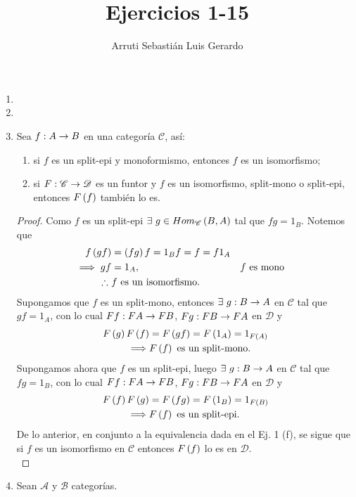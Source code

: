 \documentclass{article}
\title{Ejercicios 1-15}
\author{Arruti Sebastián Luis Gerardo}
\begin{document}
	\begin{enumerate}[label=\textbf{Ej \arabic*.}]
		\item 
		\item
		\item Sea $\catarrow{f}{A}{B}{}$ en una categoría $\mathscr{C}$, así:
		\begin{enumerate}
			\item si $f$ es un split-epi y monoformismo, entonces $f$ es un isomorfismo;
			\item si $\catarrow{F}{\mathscr{C}}{\mathscr{D}}{}$ es un funtor y $f$ es un isomorfismo, split-mono o split-epi, entonces $F\left(f\right)$ también lo es.
		\end{enumerate}
		\begin{proof}
			 Como $f$ es un split-epi $\exists\ g\in\ringmodhom{\mathscr{C}}{B}{A}$ tal que $fg=1_B$. Notemos que
			\begin{align*}
				f\left(gf\right)&=\left(fg\right)f=1_B f=f=f1_A\\
				\implies gf&=1_A, && f\text{ es mono}\\
				\therefore\ & f \text{ es un isomorfismo.}
			\end{align*}
			 Supongamos que $f$ es un split-mono, entonces $\exists\ \catarrow{g}{B}{A}{}$ en $\mathscr{C}$ tal que $gf=1_A$, con lo cual $\catarrow{Ff}{FA}{FB}{}$, $\catarrow{Fg}{FB}{FA}{}$ en $\mathscr{D}$ y
			\begin{align*}
				F\left(g\right)F\left(f\right)&=F\left(gf\right)=F\left(1_A\right)=1_{F\left(A\right)}\\
				\implies & F\left(f\right)\text{ es un split-mono.}
			\end{align*}
			Supongamos ahora que $f$ es un split-epi, luego $\exists\ \catarrow{g}{B}{A}{}$ en $\mathscr{C}$ tal que $fg=1_B$, con lo cual $\catarrow{Ff}{FA}{FB}{}$, $\catarrow{Fg}{FB}{FA}{}$ en $\mathscr{D}$ y
			\begin{align*}
				F\left(f\right)F\left(g\right)&=F\left(fg\right)=F\left(1_B\right)=1_{F\left(B\right)}\\
				\implies & F\left(f\right)\text{ es un split-epi.}
			\end{align*}   
			De lo anterior, en conjunto a la equivalencia dada en el Ej. 1 (f), se sigue que si $f$ es un isomorfismo en $\mathscr{C}$ entonces $F\left(f\right)$ lo es en $\mathscr{D}$.\\
		\end{proof}
		\item Sean $\mathscr{A}$ y $\mathscr{B}$ categorías.
		\begin{enumerate}

\end{enumerate}
\end{enumerate}
\end{document}
